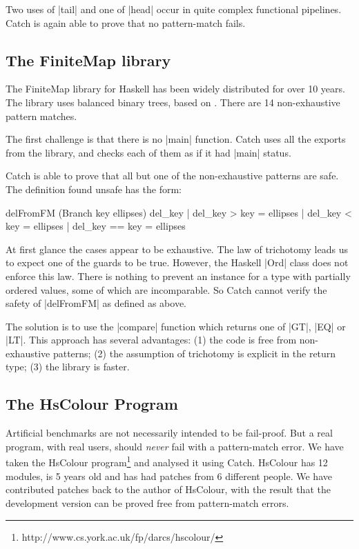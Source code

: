 \noindent Two uses of |tail| and one of |head| occur in quite complex functional pipelines. Catch is again able to prove that no pattern-match fails.

\subsection{The FiniteMap library}
\label{secC:finitemap}

The FiniteMap library for Haskell has been widely distributed for over 10 years. The library uses balanced binary trees, based on \cite{adams:sets}. There are 14 non-exhaustive pattern matches.

The first challenge is that there is no |main| function. Catch uses all the exports from the library, and checks each of them as if it had |main| status.

Catch is able to prove that all but one of the non-exhaustive patterns are safe. The definition found unsafe has the form:

\begin{code}
delFromFM (Branch key ellipses) del_key  | del_key  >   key = ellipses
                                         | del_key  <   key = ellipses
                                         | del_key  ==  key = ellipses
\end{code}

At first glance the cases appear to be exhaustive. The law of trichotomy leads us to expect one of the guards to be true. However, the Haskell |Ord| class does not enforce this law. There is nothing to prevent an instance for a type with partially ordered values, some of which are incomparable. So Catch cannot verify the safety of |delFromFM| as defined as above.

The solution is to use the |compare| function which returns one of |GT|, |EQ| or |LT|. This approach has several advantages: (1) the code is free from non-exhaustive patterns; (2) the assumption of trichotomy is explicit in the return type; (3) the library is faster.


\subsection{The HsColour Program}
\label{secC:hscolour}

Artificial benchmarks are not necessarily intended to be fail-proof. But a real program, with real users, should \textit{never} fail with a pattern-match error. We have taken the HsColour program\footnote{http://www.cs.york.ac.uk/fp/darcs/hscolour/} and analysed it using Catch. HsColour has 12 modules, is 5 years old and has had patches from 6 different people.
We have contributed patches back to the author of HsColour, with the result that the development version can be proved free from pattern-match errors.

